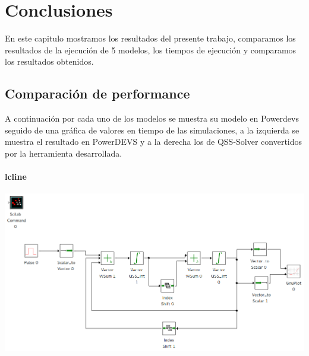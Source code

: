 \documentclass[a4paper,	11pt]{report}
\begin{document}
\chapter{Conclusiones}
En este capitulo mostramos los resultados del presente trabajo, comparamos los resultados de la ejecución de 5 modelos, los tiempos de ejecución y comparamos los resultados obtenidos.


\section{Comparación de performance}
A continuación por cada uno de los modelos se muestra su modelo en Powerdevs seguido de una gráfica de valores en tiempo de las simulaciones, a la izquierda se muestra el resultado en PowerDEVS y a la derecha los de QSS-Solver convertidos por la herramienta desarrollada.

\subsubsection{lcline}

 \includegraphics[width=0.75\linewidth]{lclines}
\end{document}
